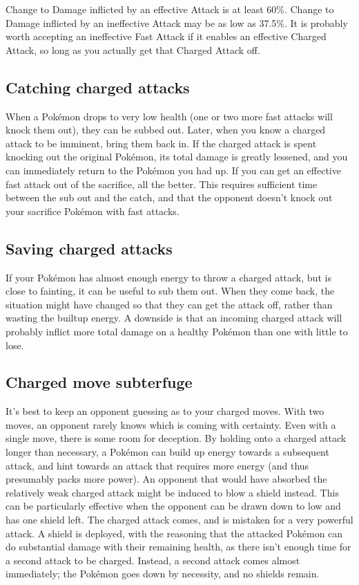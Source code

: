 Change to Damage inflicted by an effective Attack is at least 60\%.
Change to Damage inflicted by an ineffective Attack may be as
 low as 37.5\%.
It is probably worth accepting an ineffective Fast Attack if it
 enables an effective Charged Attack, so long as you actually
 get that Charged Attack off.

\subsection{Catching charged attacks}
When a Pokémon drops to very low health (one or two more fast attacks will knock
 them out), they can be subbed out.
Later, when you know a charged attack to be imminent, bring them back in.
If the charged attack is spent knocking out the original Pokémon, its total
 damage is greatly lessened, and you can immediately return to the Pokémon
 you had up.
If you can get an effective fast attack out of the sacrifice, all the better.
This requires sufficient time between the sub out and the catch, and that the
 opponent doesn't knock out your sacrifice Pokémon with fast attacks.

\subsection{Saving charged attacks}
If your Pokémon has almost enough energy to throw a charged attack, but is close to fainting, it can be useful to sub them out.
When they come back, the situation might have changed so that they can get the attack off,
 rather than wasting the builtup energy.
A downside is that an incoming charged attack will probably inflict more total
 damage on a healthy Pokémon than one with little \HP{} to lose.

\subsection{Charged move subterfuge}
It's best to keep an opponent guessing as to your charged moves.
With two moves, an opponent rarely knows which is coming with certainty.
Even with a single move, there is some room for deception.
By holding onto a charged attack longer than necessary, a Pokémon can build
  up energy towards a subsequent attack, and hint towards an attack
  that requires more energy (and thus presumably packs more power).
An opponent that would have absorbed the relatively weak charged attack
  might be induced to blow a shield instead.
This can be particularly effective when the opponent can be drawn down to low \HP{}
  and has one shield left.
The charged attack comes, and is mistaken for a very powerful attack.
A shield is deployed, with the reasoning that the attacked Pokémon can
  do substantial damage with their remaining health, as there isn't
  enough time for a second attack to be charged.
Instead, a second attack comes almost immediately; the Pokémon goes
  down by necessity, and no shields remain.

